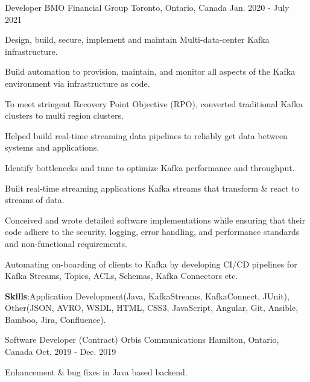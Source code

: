 \begin{cventries}
  \cventry
    {Developer} %
    {BMO Financial Group} %
    {Toronto, Ontario, Canada} %
    {Jan. 2020 - July 2021} %
    {
      \begin{cvitems} %
        \item {Design, build, secure, implement and maintain Multi-data-center Kafka infrastructure.}
        \item {Build automation to provision, maintain, and monitor all aspects of the Kafka environment via infrastructure as code.}
        \item To meet stringent Recovery Point Objective (RPO), converted traditional Kafka clusters to multi region clusters. 
        \item {Helped build real-time streaming data pipelines to reliably get data between systems and applications.}
        \item {Identify bottlenecks and tune to optimize Kafka performance and throughput.}
        \item {Built real-time streaming applications Kafka streams that transform \& react to streams of data.}
        \item {Conceived and wrote detailed software implementations while ensuring that their code adhere to the security, logging, error handling, and performance standards and non-functional requirements.}
        \item {Automating on-boarding of clients to Kafka by developing CI/CD pipelines for Kafka Streams, Topics, ACLs, Schemas, Kafka Connectors etc.}
         \vspace{1mm} %
        \item {\textbf{Skills}:Application Development(Java, KafkaStreams, KafkaConnect, JUnit), Other(JSON, AVRO, WSDL, HTML, CSS3, JavaScript, Angular, Git, Ansible, Bamboo, Jira, Confluence).}
      \end{cvitems}
    }
    \vspace{5mm} %
  \cventry
    {Software Developer (Contract)} %
    {Orbis Communications} %
    {Hamilton, Ontario, Canada} %
    {Oct. 2019 - Dec. 2019} %
    {
      \begin{cvitems} %
        \item {Enhancement \& bug fixes in Java based backend.}

\end{cvitems}}
\end{cventries}
